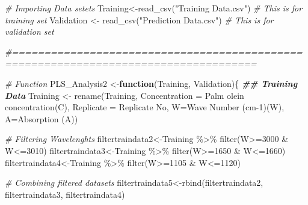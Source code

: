 \documentclass[
]{article}
\newenvironment{Shaded}{\begin{snugshade}}{\end{snugshade}}
\newcommand{\AttributeTok}[1]{\textcolor[rgb]{0.77,0.63,0.00}{#1}}
\newcommand{\CommentTok}[1]{\textcolor[rgb]{0.56,0.35,0.01}{\textit{#1}}}
\newcommand{\ControlFlowTok}[1]{\textcolor[rgb]{0.13,0.29,0.53}{\textbf{#1}}}
\newcommand{\DecValTok}[1]{\textcolor[rgb]{0.00,0.00,0.81}{#1}}
\newcommand{\DocumentationTok}[1]{\textcolor[rgb]{0.56,0.35,0.01}{\textbf{\textit{#1}}}}
\newcommand{\FunctionTok}[1]{\textcolor[rgb]{0.00,0.00,0.00}{#1}}
\newcommand{\NormalTok}[1]{#1}
\newcommand{\OtherTok}[1]{\textcolor[rgb]{0.56,0.35,0.01}{#1}}
\newcommand{\SpecialCharTok}[1]{\textcolor[rgb]{0.00,0.00,0.00}{#1}}
\newcommand{\StringTok}[1]{\textcolor[rgb]{0.31,0.60,0.02}{#1}}
\begin{document}
\begin{Shaded}
\begin{Highlighting}[]
\CommentTok{\# Importing Data setets}
\NormalTok{Training}\OtherTok{\textless{}{-}}\FunctionTok{read\_csv}\NormalTok{(}\StringTok{"Training Data.csv"}\NormalTok{) }\CommentTok{\# This is for training set}
\NormalTok{Validation }\OtherTok{\textless{}{-}} \FunctionTok{read\_csv}\NormalTok{(}\StringTok{"Prediction Data.csv"}\NormalTok{) }\CommentTok{\# This is for validation set}

\CommentTok{\#====================================================================================}

\CommentTok{\# Function }
\NormalTok{PLS\_Analysis2 }\OtherTok{\textless{}{-}}\ControlFlowTok{function}\NormalTok{(Training, Validation)\{}
  \DocumentationTok{\#\# Training Data }
\NormalTok{  Training }\OtherTok{\textless{}{-}} \FunctionTok{rename}\NormalTok{(Training, }\AttributeTok{Concentration =} \StringTok{\textasciigrave{}}\AttributeTok{Palm olein concentration(C)}\StringTok{\textasciigrave{}}\NormalTok{, }
                     \AttributeTok{Replicate =} \StringTok{\textasciigrave{}}\AttributeTok{Replicate No}\StringTok{\textasciigrave{}}\NormalTok{, }\AttributeTok{W=}\StringTok{\textasciigrave{}}\AttributeTok{Wave Number (cm{-}1)(W)}\StringTok{\textasciigrave{}}\NormalTok{, }\AttributeTok{A=}\StringTok{\textasciigrave{}}\AttributeTok{Absorption (A)}\StringTok{\textasciigrave{}}\NormalTok{)}
  
  \CommentTok{\# Filtering Wavelenghts}
\NormalTok{  filtertraindata2}\OtherTok{\textless{}{-}}\NormalTok{Training }\SpecialCharTok{\%\textgreater{}\%} \FunctionTok{filter}\NormalTok{(W}\SpecialCharTok{\textgreater{}=}\DecValTok{3000} \SpecialCharTok{\&}\NormalTok{ W}\SpecialCharTok{\textless{}=}\DecValTok{3010}\NormalTok{)}
\NormalTok{  filtertraindata3}\OtherTok{\textless{}{-}}\NormalTok{Training }\SpecialCharTok{\%\textgreater{}\%} \FunctionTok{filter}\NormalTok{(W}\SpecialCharTok{\textgreater{}=}\DecValTok{1650} \SpecialCharTok{\&}\NormalTok{ W}\SpecialCharTok{\textless{}=}\DecValTok{1660}\NormalTok{)}
\NormalTok{  filtertraindata4}\OtherTok{\textless{}{-}}\NormalTok{Training }\SpecialCharTok{\%\textgreater{}\%} \FunctionTok{filter}\NormalTok{(W}\SpecialCharTok{\textgreater{}=}\DecValTok{1105} \SpecialCharTok{\&}\NormalTok{ W}\SpecialCharTok{\textless{}=}\DecValTok{1120}\NormalTok{)}
  
  \CommentTok{\# Combining filtered datasets}
\NormalTok{  filtertraindata5}\OtherTok{\textless{}{-}}\FunctionTok{rbind}\NormalTok{(filtertraindata2, filtertraindata3, filtertraindata4) }
  

\end{Highlighting}
\end{Shaded}
\end{document}

